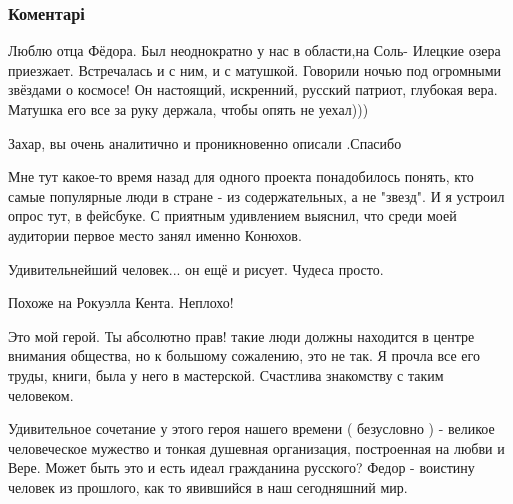  
 
 
 
 
\subsubsection{Коментарі}
\label{sec:01_10_2021.fb.prilepin_zahar.1.fedor_konjuhov_vystavka.cmt}

\begin{itemize} %

Люблю отца Фёдора. Был неоднократно у нас в области,на Соль- Илецкие озера
приезжает. Встречалась и с ним, и с матушкой. Говорили ночью под огромными
звёздами о космосе! Он настоящий, искренний, русский патриот, глубокая вера.
Матушка его все за руку держала, чтобы опять не уехал)))


Захар, вы очень аналитично и проникновенно описали .Спасибо


Мне тут какое-то время назад для одного проекта понадобилось понять, кто самые
популярные люди в стране - из содержательных, а не "звезд". И я устроил опрос
тут, в фейсбуке. С приятным удивлением выяснил, что среди моей аудитории первое
место занял именно Конюхов.



Удивительнейший человек... он ещё и рисует. Чудеса просто.


Похоже на Рокуэлла Кента. Неплохо!


Это мой герой. Ты абсолютно прав! такие люди должны находится в центре внимания
общества, но к большому сожалению, это не так. Я прочла все его труды, книги,
была у него в мастерской. Счастлива знакомству с таким человеком.


Удивительное сочетание у этого героя нашего времени ( безусловно ) - великое
человеческое мужество и тонкая душевная организация, построенная на любви и
Вере. Может быть это и есть идеал гражданина русского? Федор - воистину человек
из прошлого, как то явившийся в наш сегодняшний мир.


\end{itemize}
